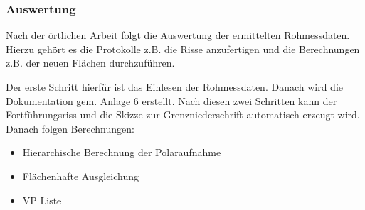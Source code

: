 \subsubsection{Auswertung}

Nach der örtlichen Arbeit folgt die Auswertung der ermittelten Rohmessdaten. Hierzu gehört es die Protokolle z.B. die Risse anzufertigen und die Berechnungen z.B. der neuen Flächen durchzuführen. 

Der erste Schritt hierfür ist das Einlesen der Rohmessdaten.  Danach wird die Dokumentation gem. Anlage 6 erstellt.  Nach diesen zwei Schritten kann der Fortführungsriss und die Skizze zur Grenzniederschrift automatisch erzeugt wird.  Danach folgen Berechnungen:
\begin{itemize}
	\item Hierarchische Berechnung der Polaraufnahme
	\item Flächenhafte Ausgleichung
	\item VP Liste
\end{itemize}


